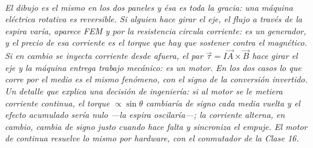 \begin{center}
\\[0.5em]
{\small\itshape El dibujo es el mismo en los dos paneles y ésa es toda la
gracia: una máquina eléctrica rotativa es reversible. Si alguien hace girar el
eje, el flujo a través de la espira varía, aparece FEM y por la resistencia
circula corriente: es un generador, y el precio de esa corriente es el torque
que hay que sostener contra el magnético. Si en cambio se inyecta corriente
desde afuera, el par $\vec\tau = I\vec A\times\vec B$ hace girar el eje y la
máquina entrega trabajo mecánico: es un motor. En los dos casos lo que corre por
el medio es el mismo fenómeno, con el signo de la conversión invertido. Un
detalle que explica una decisión de ingeniería: si al motor se le metiera
corriente \emph{continua}, el torque $\propto\sin\theta$ cambiaría de signo cada
media vuelta y el efecto acumulado sería nulo ---la espira oscilaría---; la
corriente alterna, en cambio, cambia de signo justo cuando hace falta y
sincroniza el empuje. El motor de continua resuelve lo mismo por hardware, con
el conmutador de la Clase 16.}
\end{center}
